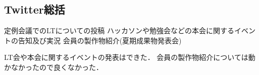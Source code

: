 \subsection*{Twitter総括}

定例会議でのLTについての投稿
ハッカソンや勉強会などの本会に関するイベントの告知及び実況
会員の製作物紹介(夏期成果物発表会) 

LT会や本会に関するイベントの発表はできた．
会員の製作物紹介については動かなかったので良くなかった．